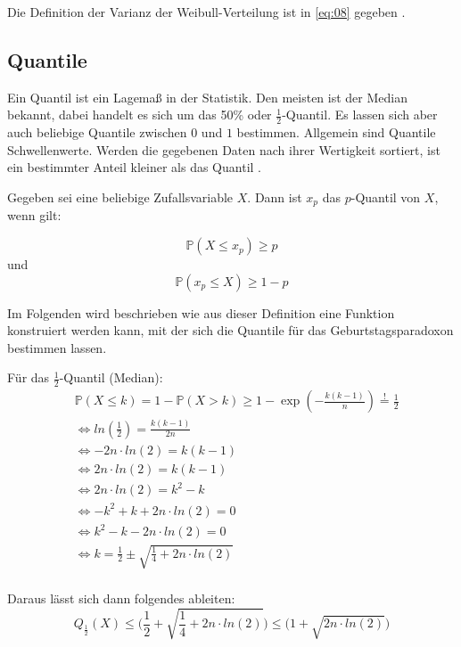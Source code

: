 \documentclass[../main.tex]{subfiles}
\begin{document}
\begin{flushleft}
Die Definition der Varianz der Weibull-Verteilung ist in \ref{eq:08} gegeben \cite{rinne}.

 \subsection{Quantile}

Ein Quantil ist ein Lagemaß in der Statistik. Den meisten ist der Median bekannt, dabei handelt es sich um das 50\% oder $\frac{1}{2}$-Quantil. Es lassen sich aber auch beliebige Quantile zwischen $0$ und $1$ bestimmen. Allgemein sind Quantile Schwellenwerte. Werden die gegebenen Daten nach ihrer Wertigkeit sortiert, ist ein bestimmter Anteil kleiner als das Quantil \cite[32,35,37]{henze}. \newline

Gegeben sei eine beliebige Zufallsvariable $X$. Dann ist $x_{p}$ das $p$-Quantil von $X$, wenn gilt:

\begin{equation}
\mathbb{P}(X \leq x_p) \geq p
\end{equation}
und
\begin{equation}
\mathbb{P}( x_p \leq X ) \geq 1- p
\end{equation}

Im Folgenden wird beschrieben wie aus dieser Definition eine Funktion konstruiert werden kann, mit der sich die Quantile für das Geburtstagsparadoxon bestimmen lassen. \newline

Für das  $\frac{1}{2}$-Quantil (Median):
\begin{align*}
& \mathbb{P}(X \leq k) = 1 - \mathbb{P}(X > k) \geq 1 - \exp(-\frac{ k(k-1) }{ n }) \overset{!}{=} \frac{ 1 }{ 2 } \\
& \Leftrightarrow ln(\frac{ 1 }{ 2 }) = \frac{ k(k-1)}{ 2n } \\
& \Leftrightarrow -2n\cdot ln(2) = k(k-1) \\
& \Leftrightarrow 2n\cdot ln(2) = k(k-1) \\
& \Leftrightarrow 2n\cdot ln(2) = k^{2} - k \\
& \Leftrightarrow - k^{2} + k + 2n\cdot ln(2) = 0 \\
& \Leftrightarrow k^{2} - k - 2n\cdot ln(2) = 0 \\
& \Leftrightarrow k = \frac{ 1 }{ 2 } \pm \sqrt{ \frac{ 1 }{ 4 } + 2n\cdot ln(2)} \\
\end{align*}

Daraus lässt sich dann folgendes ableiten:
\begin{equation}
Q_{ \frac{ 1 }{ 2 } }(X) \leq \bigg( \frac{ 1 }{ 2 } + \sqrt{ \frac{ 1 }{ 4 } + 2n\cdot ln(2)} \bigg) \leq \bigg(1+\sqrt{ 2n\cdot ln(2) }\bigg)
\end{equation}
\newline


\end{flushleft}
\end{document}

